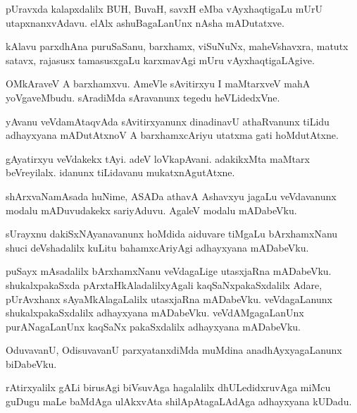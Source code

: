 \documentclass{article}
\begin{document}
\begin{mn}
pUravxda kalapxdalilx BUH, BuvaH, savxH eMba vAyxhaqtigaLu mUrU utapxnanxvAdavu. elAlx 
ashuBagaLanUnx nAsha mADutatxve.
\end{mn}

\begin{mn}
kAlavu parxdhAna puruSaSanu, barxhamx, viSuNuNx, maheVshavxra, matutx satavx, rajasusx 
tamasusxgaLu karxmavAgi mUru vAyxhaqtigaLAgive.
\end{mn}

\begin{mn}
OMkAraveV A barxhamxvu. AmeVle sAvitirxyu I maMtarxveV mahA yoVgaveMbudu. sAradiMda sAravanunx 
tegedu heVLidedxVne.
\end{mn}

\begin{mn}
yAvanu veVdamAtaqvAda sAvitirxyanunx dinadinavU athaRvanunx tiLidu adhayxyana mADutAtxnoV A 
barxhamxcAriyu utatxma gati hoMdutAtxne.
\end{mn}

\begin{mn}
gAyatirxyu veVdakekx tAyi. adeV loVkapAvani. adakikxMta maMtarx beVreyilalx. idanunx tiLidavanu
mukatxnAgutAtxne.
\end{mn}

\begin{mn}
shArxvaNamAsada huNime, ASADa athavA Ashavxyu jagaLu veVdavanunx modalu mADuvudakekx sariyAduvu. 
AgaleV modalu mADabeVku.
\end{mn}

\begin{mn}
sUrayxnu dakiSxNAyanavanunx hoMdida aiduvare tiMgaLu bArxhamxNanu shuci deVshadalilx kuLitu 
bahamxcAriyAgi adhayxyana mADabeVku.
\end{mn}

\begin{mn}
puSayx mAsadalilx bArxhamxNanu veVdagaLige utasxjaRna mADabeVku. shukalxpakaSxda 
pArxtaHkAladalilxyAgali kaqSaNxpakaSxdalilx Adare, pUrAvxhanx sAyaMkAlagaLalilx utasxjaRna 
mADabeVku. veVdagaLanunx shukalxpakaSxdalilx adhayxyana mADabeVku. veVdAMgagaLanUnx 
purANagaLanUnx kaqSaNx pakaSxdalilx adhayxyana mADabeVku.
\end{mn}

\begin{mn}
OduvavanU, OdisuvavanU parxyatanxdiMda muMdina anadhAyxyagaLanunx biDabeVku.
\end{mn}

\begin{mn}
rAtirxyalilx gALi birusAgi biVsuvAga hagalalilx dhULedidxruvAga miMcu guDugu maLe baMdAga 
ulAkxvAta shilApAtagaLAdAga adhayxyana kUDadu.
\end{mn}
\end{document}
